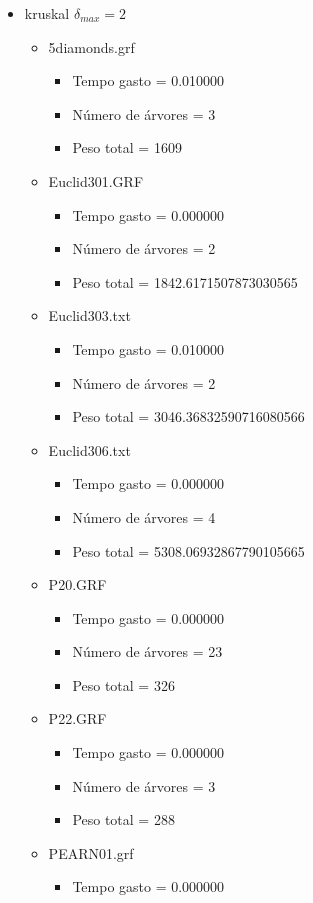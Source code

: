 \begin{itemize}
\item kruskal $\delta_{max}=2$
\begin{itemize}
\item 5diamonds.grf
\begin{itemize}
\item Tempo gasto = 0.010000
\item Número de árvores = 3
\item Peso total = 1609
\end{itemize}
\item Euclid301.GRF
\begin{itemize}
\item Tempo gasto = 0.000000
\item Número de árvores = 2
\item Peso total = 1842.6171507873030565
\end{itemize}
\item Euclid303.txt
\begin{itemize}
\item Tempo gasto = 0.010000
\item Número de árvores = 2
\item Peso total = 3046.36832590716080566
\end{itemize}
\item Euclid306.txt
\begin{itemize}
\item Tempo gasto = 0.000000
\item Número de árvores = 4
\item Peso total = 5308.06932867790105665
\end{itemize}
\item P20.GRF
\begin{itemize}
\item Tempo gasto = 0.000000
\item Número de árvores = 23
\item Peso total = 326
\end{itemize}
\item P22.GRF
\begin{itemize}
\item Tempo gasto = 0.000000
\item Número de árvores = 3
\item Peso total = 288
\end{itemize}
\item PEARN01.grf
\begin{itemize}
\item Tempo gasto = 0.000000

\end{itemize}
\end{itemize}
\end{itemize}
